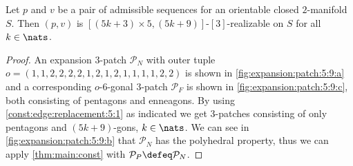 \begin{theorem}
  Let $p$ and $v$ be a pair of admissible sequences for an orientable closed $2$-manifold $S$. Then $(p, v)$ is $[(5k + 3) \times 5, (5k+9)]$-$[3]$-realizable on $S$ for all $k \in \nats$.
  \begin{proof}
    An expansion $3$-patch $\mathcal{P}_N$ with outer tuple $o = (1, 1, 2, 2, 2, 2, 1, 2, 1, 2, 1, 1, 1, 1, 2, 2)$ is shown in \autoref{fig:expansion:patch:5:9:a} and a corresponding $o$-$6$-gonal $3$-patch $\mathcal{P}_F$ is shown in \autoref{fig:expansion:patch:5:9:c}, both consisting of pentagons and enneagons. By using \autoref{const:edge:replacement:5:1} as indicated we get $3$-patches consisting of only pentagons and $(5k+9)$-gons, $k \in \nats$. We can see in \autoref{fig:expansion:patch:5:9:b} that $\mathcal{P}_N$ has the polyhedral property, thus we can apply \autoref{thm:main:const} with $\mathcal{P}_P \defeq \mathcal{P}_N$.
  \end{proof}
\end{theorem}
